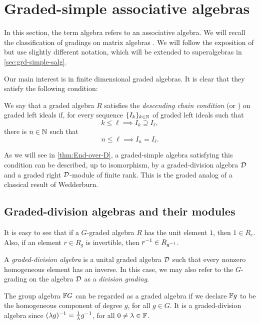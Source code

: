
\section{Graded-simple associative algebras}\label{sec:gradings-on-matrix-algebras}

In this section, the term
algebra refers to an associative algebra.
We will recall the classification of gradings on matrix algebras \cite{BSZ01, BZ02, BK10}. 
We will follow the exposition of \cite[Chapter 2]{livromicha} but use slightly different notation, which will be extended to superalgebras in \cref{sec:grd-simple-salg}.

Our main interest is in finite dimensional graded algebras. 
It is clear that they satisfy the following condition:

\begin{defi}\label{def:dcc}
    We say that a graded algebra $R$ satisfies the \emph{descending chain condition} (or \emph{\dcc}) on graded left ideals if, for every sequence $\{I_k\}_{k\in \mathbb{N}}$ of graded left ideals such that \[k \leq \ell \implies I_k \supseteq I_\ell,\] there is $n\in \mathbb{N}$ such that \[n \leq \ell \implies I_n = I_\ell.\]
\end{defi}

As we will see in \cref{thm:End-over-D}, a graded-simple algebra satisfying this condition can be described, up to isomorphism, by a graded-division algebra $\mathcal{D}$ and a graded right $\mathcal{D}$-module of finite rank. 
This is the graded analog of a classical result of Wedderburn.

\subsection{Graded-division algebras and their modules}\label{ssec:D-modules}

It is easy to see that if a $G$-graded algebra $R$ has the unit element $1$, then $1 \in R_e$. 
Also, if an element $r\in R_g$ is invertible, then $r^{-1} \in R_{g^{-1}}$.

\begin{defi}\label{def:graded-division-algebra}
    A \emph{graded-division algebra} is a unital graded algebra $\mathcal{D}$ such that every nonzero homogeneous element has an inverse. 
    In this case, we may also refer to the $G$-grading on the algebra $\mathcal{D}$ as a \emph{division grading}.
\end{defi}

\begin{ex}\label{ex:group-algebra}
    The group algebra $\mathbb{F} G$ can be regarded as a graded algebra if we declare $\mathbb{F} g$ to be the homogeneous component of degree $g$, for all $g\in G$. 
    It is a graded-division algebra since $(\lambda g)^{-1} = \frac1\lambda g^{-1}$, for all $0 \neq \lambda \in \mathbb{F}$.
\end{ex}

